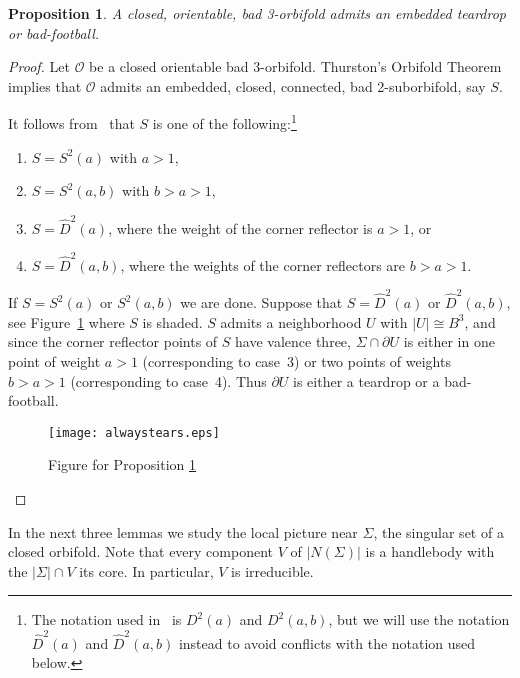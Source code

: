 \documentclass[12pt,reqno]{amsart}
\theoremstyle{plain}
\theoremstyle{definition}
\numberwithin{subcase}{case}
\theoremstyle{plain}
\newtheorem{propn}[thm]{Proposition}
\theoremstyle{definition}
\def\scl[#1][#2]{{\scalebox{#1}{#2}}}
\newcommand{\OO}{\mathcal{O}}
\begin{document}
\begin{propn}\label{torf}
A closed, orientable, bad 3-orbifold admits an embedded teardrop or bad-football.
\end{propn}

\begin{proof}
Let $\OO$ be a  closed orientable bad 3-orbifold.
Thurston's Orbifold Theorem implies that $\OO$ admits an embedded, closed, connected, bad 2-suborbifold, say $S$. 

It follows from~\cite[Theorem~2.3, page~425]{scott} that \(S\) is one of the following:\footnote{The notation used in~\cite{scott} is $D^2(a)$ and $D^2(a,b)$, but we will use the notation $\widehat D^2(a)$ and $\widehat D^2(a,b)$ instead to avoid conflicts with the notation used below.}
\begin{enumerate}
\item $S=S^2(a)$ with $a>1$,
\item $S=S^2(a,b)$ with $b>a>1$,%
\item $S=\widehat D^2(a)$, where the weight of the corner reflector is $a>1$, or
\item $S=\widehat D^2(a,b)$, where the weights of the corner reflectors are $b>a>1$.
\end{enumerate}
If $S=S^2(a)$ or $S^2(a,b)$ we are done.
Suppose that $S=\widehat D^2(a)$ or $\widehat D^2(a,b)$, see Figure~\ref{Figure for Proposition torf} where \(S\) is shaded.
\(S\) admits a neighborhood \(U\) with \(|U| \cong B^{3}\), and since the corner reflector points of $S$ have valence three, \(\Sigma \cap \partial U\) is either in one point of weight \(a>1\) (corresponding to case~3) or two points of weights \(b>a>1\) (corresponding to case~4).  Thus \(\partial U\) is either a teardrop or a bad-football.
\begin{figure}[h!]
\psfrag{2}{\scl[.7][$2$]}
\psfrag{p}{\scl[.7][$a$]}
\psfrag{q}{\scl[.7][$b$]}
\centerline{\texttt{[image: alwaystears.eps]}}
\caption{Figure for Proposition \ref{torf}}
\label{Figure for Proposition torf}
\end{figure}
\end{proof}

In the next three lemmas we study the local picture near \(\Sigma\),  the singular set of a closed orbifold.  Note that every component \(V\) of \(|N(\Sigma)|\) is a handlebody with the \(|\Sigma| \cap V\) its core.  In particular, \(V\) is irreducible.
\end{document}

